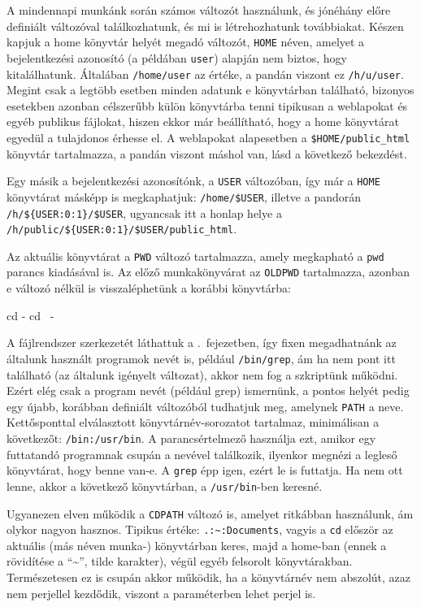 A mindennapi munkánk során számos változót használunk, és
jónéhány előre definiált változóval találkozhatunk, és mi is létrehozhatunk
továbbiakat. Készen kapjuk a home könyvtár helyét megadó változót, \texttt{HOME}
néven, amelyet a bejelentkezési azonosító (a példában \texttt{user}) alapján nem
biztos, hogy kitalálhatunk. Általában \texttt{/home/user} az értéke, a pandán
viszont ez \texttt{/h/u/user}. Megint csak a legtöbb esetben minden adatunk e
könyvtárban található, bizonyos esetekben azonban célszerűbb külön könyvtárba
tenni tipikusan a weblapokat és egyéb publikus fájlokat, hiszen ekkor már
beállítható, hogy a home könyvtárat egyedül a tulajdonos érhesse el. A
weblapokat alapesetben a \texttt{\$HOME/public\_html} könyvtár tartalmazza, a
pandán viszont máshol van, lásd a következő bekezdést.

Egy másik a bejelentkezési azonosítónk, a \texttt{USER} változóban, így már a
\texttt{HOME} könyvtárat másképp is megkaphatjuk: \verb|/home/$USER|, illetve
a pandorán \verb|/h/${USER:0:1}/$USER|, ugyancsak itt a honlap helye a
\verb|/h/public/${USER:0:1}/$USER/public_html|.

Az aktuális könyvtárat a \texttt{PWD} változó tartalmazza, amely megkapható a
\texttt{pwd} parancs kiadásával is. Az előző munkakönyvárat az \texttt{OLDPWD}
tartalmazza, azonban e változó nélkül is visszaléphetünk a korábbi könyvtárba:
\begin{VerbExample}
cd -
cd ~-
\end{VerbExample}

A fájlrendszer szerkezetét láthattuk a .\ fejezetben, így fixen
megadhatnánk az általunk használt programok nevét is, például
\texttt{/bin/grep}, ám ha nem pont itt található (az általunk igényelt
változat), akkor nem fog a szkriptünk működni. Ezért elég csak a program nevét
(például grep) ismernünk, a pontos helyét pedig egy újabb, korábban definiált
változóból tudhatjuk meg, amelynek \texttt{PATH} a neve. Kettősponttal
elválasztott könyvtárnév-sorozatot tartalmaz, minimálisan a következőt:
\texttt{/bin:/usr/bin}. A parancsértelmező használja ezt, amikor egy futtatandó
programnak csupán a nevével találkozik, ilyenkor megnézi a legleső könyvtárat,
hogy benne van-e. A \texttt{grep} épp igen, ezért le is futtatja. Ha nem ott
lenne, akkor a következő könyvtárban, a \texttt{/usr/bin}-ben keresné.

Ugyanezen elven működik a \texttt{CDPATH} változó is, amelyet ritkábban
használunk, ám olykor nagyon hasznos. Tipikus értéke: \texttt{.:\~{}:Documents},
vagyis a \texttt{cd} először az aktuális (más néven munka-) könyvtárban keres,
majd a home-ban (ennek a rövidítése a ``\~{}'', tilde karakter), végül egyéb
felsorolt könyvtárakban. Természetesen ez is csupán akkor működik, ha a
könyvtárnév nem abszolút, azaz nem perjellel kezdődik, viszont a paraméterben
lehet perjel is.

